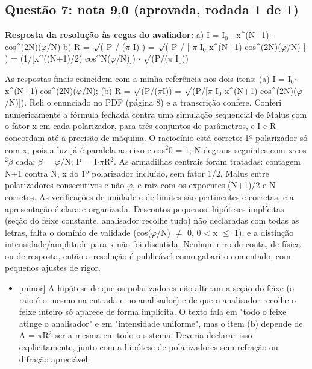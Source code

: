 \documentclass{article}%
\begin{document}
\subsection*{Questão 7: nota 9,0 (aprovada, rodada 1 de 1)}%
\textbf{Resposta da resolução às cegas do avaliador:} a) I = I$_{0}$ $\cdot$ x\^{}(N+1) $\cdot$ cos\^{}(2N)($\varphi$/N)\newline%
\newline%
b) R = $\surd$( P / ($\pi$ I) ) = $\surd$( P / {[} $\pi$ I$_{0}$ x\^{}(N+1) cos\^{}(2N)($\varphi$/N) {]} ) = (1/{[}x\^{}((N+1)/2) cos\^{}N($\varphi$/N){]}) $\cdot$ $\surd$(P/($\pi$ I$_{0}$))\par %
As respostas finais coincidem com a minha referência nos dois itens: (a) I = I$_{0}$$\cdot$x\^{}(N+1)$\cdot$cos\^{}(2N)($\varphi$/N); (b) R = $\surd$(P/($\pi$I)) = $\surd$(P/{[}$\pi$ I$_{0}$ x\^{}(N+1) cos\^{}(2N)($\varphi$/N){]}). Reli o enunciado no PDF (página 8) e a transcrição confere. Conferi numericamente a fórmula fechada contra uma simulação sequencial de Malus com o fator x em cada polarizador, para três conjuntos de parâmetros, e I e R concordam até a precisão de máquina. O raciocínio está correto: 1º polarizador só com x, pois a luz já é paralela ao eixo e cos$^2$0 = 1; N degraus seguintes com x$\cdot$cos$^2$$\beta$ cada; $\beta$ = $\varphi$/N; P = I$\cdot$$\pi$R$^2$. As armadilhas centrais foram tratadas: contagem N+1 contra N, x do 1º polarizador incluído, sem fator 1/2, Malus entre polarizadores consecutivos e não $\varphi$, e raiz com os expoentes (N+1)/2 e N corretos. As verificações de unidade e de limites são pertinentes e corretas, e a apresentação é clara e organizada. Descontos pequenos: hipóteses implícitas (seção do feixe constante, analisador recolhe tudo) não declaradas com todas as letras, falta o domínio de validade (cos($\varphi$/N) $\neq$ 0, 0 < x $\leq$ 1), e a distinção intensidade/amplitude para x não foi discutida. Nenhum erro de conta, de física ou de resposta, então a resolução é publicável como gabarito comentado, com pequenos ajustes de rigor.%
\begin{itemize}%
\item%
{[}minor{]} A hipótese de que os polarizadores não alteram a seção do feixe (o raio é o mesmo na entrada e no analisador) e de que o analisador recolhe o feixe inteiro só aparece de forma implícita. O texto fala em "todo o feixe atinge o analisador" e em "intensidade uniforme", mas o item (b) depende de A = $\pi$R$^2$ ser a mesma em todo o sistema. Deveria declarar isso explicitamente, junto com a hipótese de polarizadores sem refração ou difração apreciável.%

\end{itemize}$$
\end{document}

